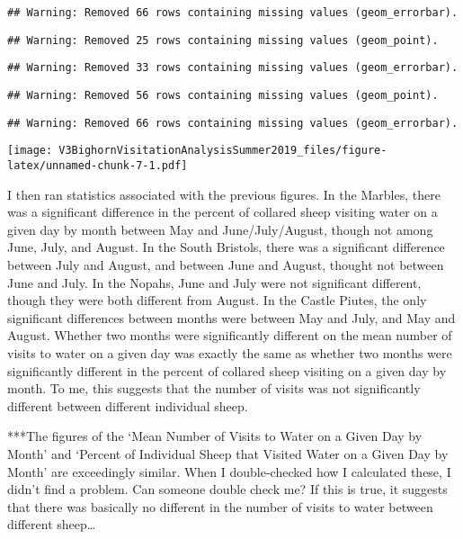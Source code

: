 \documentclass[]{article}
\begin{document}
\begin{verbatim}
## Warning: Removed 66 rows containing missing values (geom_errorbar).
\end{verbatim}

\begin{verbatim}
## Warning: Removed 25 rows containing missing values (geom_point).
\end{verbatim}

\begin{verbatim}
## Warning: Removed 33 rows containing missing values (geom_errorbar).
\end{verbatim}

\begin{verbatim}
## Warning: Removed 56 rows containing missing values (geom_point).
\end{verbatim}

\begin{verbatim}
## Warning: Removed 66 rows containing missing values (geom_errorbar).
\end{verbatim}

\texttt{[image: V3BighornVisitationAnalysisSummer2019\_files/figure-latex/unnamed-chunk-7-1.pdf]}

I then ran statistics associated with the previous figures. In the
Marbles, there was a significant difference in the percent of collared
sheep visiting water on a given day by month between May and
June/July/August, though not among June, July, and August. In the South
Bristols, there was a significant difference between July and August,
and between June and August, thought not between June and July. In the
Nopahs, June and July were not significant different, though they were
both different from August. In the Castle Piutes, the only significant
differences between months were between May and July, and May and
August. Whether two months were significantly different on the mean
number of visits to water on a given day was exactly the same as whether
two months were significantly different in the percent of collared sheep
visiting on a given day by month. To me, this suggests that the number
of visits was not significantly different between different individual
sheep.

***The figures of the `Mean Number of Visits to Water on a Given Day by
Month' and `Percent of Individual Sheep that Visited Water on a Given
Day by Month' are exceedingly similar. When I double-checked how I
calculated these, I didn't find a problem. Can someone double check me?
If this is true, it suggests that there was basically no different in
the number of visits to water between different sheep\ldots{}
\end{document}
